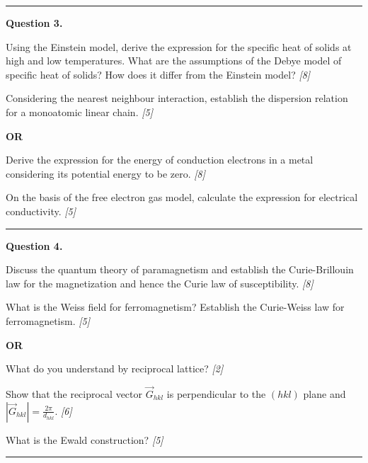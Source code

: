 \documentclass[11pt,a4paper]{article}
\newcommand{\pts}[1]{\hfill   \textit{[#1]}}
\begin{document}
\medskip\rule{\linewidth}{0.2pt}




\noindent   \textbf{Question 3.}

\begin{parts}
  \item Using the Einstein model, derive the expression for the specific heat of solids at high and low temperatures. What are the assumptions of the Debye model of specific heat of solids? How does it differ from the Einstein model? \pts{8}
  \item Considering the nearest neighbour interaction, establish the dispersion relation for a monoatomic linear chain. \pts{5}
\end{parts}
\hfill   \textbf{OR}

\begin{parts}
  \item Derive the expression for the energy of conduction electrons in a metal considering its potential energy to be zero. \pts{8}
  \item On the basis of the free electron gas model, calculate the expression for electrical conductivity. \pts{5}
\end{parts}

\medskip\rule{\linewidth}{0.2pt}




\noindent   \textbf{Question 4.}

\begin{parts}
  \item Discuss the quantum theory of paramagnetism and establish the Curie-Brillouin law for the magnetization and hence the Curie law of susceptibility. \pts{8}
  \item What is the Weiss field for ferromagnetism? Establish the Curie-Weiss law for ferromagnetism. \pts{5}
\end{parts}
\hfill   \textbf{OR}

\begin{parts}
  \item What do you understand by reciprocal lattice? \pts{2}
  \item Show that the reciprocal vector $\vec{G}_{hkl}$ is perpendicular to the $(hkl)$ plane and $|\vec{G}_{hkl}| = \frac{2\pi}{d_{hkl}}$. \pts{6}
  \item What is the Ewald construction? \pts{5}
\end{parts}

\medskip\rule{\linewidth}{0.2pt}
\end{document}

